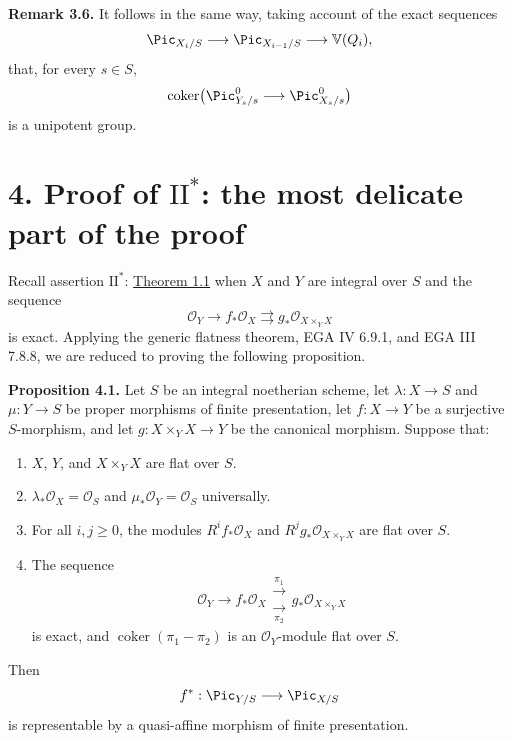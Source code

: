 \textbf{Remark 3.6.} It follows in the same way, taking account of the exact
sequences
\[
  \Pic_{X_i/S}\longrightarrow\Pic_{X_{i-1}/S}
  \longrightarrow\mathbb V(Q_i),
\]
that, for every $s\in S$,
\[
  \operatorname{coker}\bigl(
    \Pic^0_{Y_s/s}\longrightarrow\Pic^0_{X_s/s}
  \bigr)
\]
is a unipotent group.

\section*{4. Proof of $\mathrm{II}^*$: the most delicate part of the proof}

Recall assertion $\mathrm{II}^*$: \hyperlink{sga6.e12.thm.1-1}{Theorem 1.1} when $X$ and $Y$ are integral
over $S$ and the sequence
\[
  \mathcal O_Y\longrightarrow f_*\mathcal O_X
  \rightrightarrows g_*\mathcal O_{X\times_YX}
\]
is exact. Applying the generic flatness theorem, EGA IV 6.9.1, and EGA III
7.8.8, we are reduced to proving the following proposition.

\textbf{Proposition 4.1.} Let $S$ be an integral noetherian scheme, let
$\lambda:X\to S$ and $\mu:Y\to S$ be proper morphisms of finite
presentation, let $f:X\to Y$ be a surjective $S$-morphism, and let
$g:X\times_YX\to Y$ be the canonical morphism. Suppose that:
\begin{enumerate}[label=\arabic*)]
\item $X$, $Y$, and $X\times_YX$ are flat over $S$.
\item $\lambda_*\mathcal O_X=\mathcal O_S$ and
  $\mu_*\mathcal O_Y=\mathcal O_S$ universally.

\item For all $i,j\geq0$, the modules $R^if_*\mathcal O_X$ and
  $R^jg_*\mathcal O_{X\times_YX}$ are flat over $S$.
\item The sequence
  \begin{equation}\tag{*}
    \mathcal O_Y\longrightarrow f_*\mathcal O_X
    \mathrel{\substack{\xrightarrow{\pi_1}\\[-0.7ex]
                       \xrightarrow[\pi_2]{}}}
    g_*\mathcal O_{X\times_YX}
  \end{equation}
  is exact, and $\operatorname{coker}(\pi_1-\pi_2)$ is an
  $\mathcal O_Y$-module flat over $S$.
\end{enumerate}
Then
\[
  f^*:\Pic_{Y/S}\longrightarrow\Pic_{X/S}
\]
is representable by a quasi-affine morphism of finite presentation.

